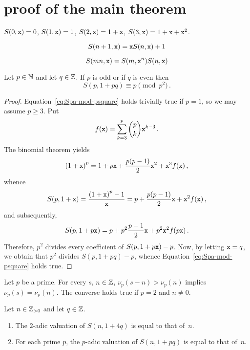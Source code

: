
\section{proof of the main theorem}


   $S(0, \mathtt{x}) = 0$, $S(1, \mathtt{x}) = 1$, $S(2, \mathtt{x}) = 1 + \mathtt{x}$, $S(3, \mathtt{x}) = 1 + \mathtt{x} + \mathtt{x}^2$.

   $$
   S(n + 1, \mathtt{x}) = \mathtt{x} S(n, \mathtt{x}) + 1
   $$

   $$
   S(mn, \mathtt{x}) = S(m, \mathtt{x}^n) S(n, \mathtt{x})
   $$

  
 
   \begin{theorem} \label{thm:p-odd-pcarre}
   Let $p \in \mathbb{N}$ and let $q \in \mathbb{Z}$.
   If $p$ is odd or if $q$ is even then
   \begin{equation} \label{eq:Spa-mod-psquare}
     S(p, 1 + pq) \equiv p \pmod {p^2}\, .
   \end{equation}
   \end{theorem}


   \begin{proof}
    Equation~\eqref{eq:Spa-mod-psquare} holds trivially true if $p = 1$,
    so we may assume $p \ge 3$.
    Put 
    $$
    f(\mathtt{x}) = \sum_{k = 3}^p \binom{p}{k} \mathtt{x}^{k - 3} \, .
    $$
    The binomial theorem yields
   $$
   {(1 + \mathtt{x})}^p =  1 + p \mathtt{x} + \frac{p(p - 1)}{2} \mathtt{x}^2 +  \mathtt{x}^3 f(\mathtt{x}) \,, 
   $$
   whence
   $$
   S(p, 1 + \mathtt{x}) = \frac{{(1 + \mathtt{x})}^p - 1}{\mathtt{x}} = p + \frac{p(p - 1)}{2} \mathtt{x} + \mathtt{x}^2 f(\mathtt{x}) \,, 
   $$
   and subsequently,
   $$
   S(p, 1 + p \mathtt{x}) = p + p^2 \frac{p - 1}{2} \mathtt{x} + p^2  \mathtt{x}^2 f(p\mathtt{x})  \,.
   $$
   Therefore, $p^2$ divides every coefficient of $S(p, 1 + p \mathtt{x}) - p$.
   Now, by letting  $\mathtt{x} = q$, we obtain that $p^2$ divides $S(p, 1 + p q) - p$,
   whence Equation~\eqref{eq:Spa-mod-psquare} holds true.
 \end{proof}

 Let $p$ be a prime.
 For every $s$, $n \in \mathbb{Z}$, 
 $\nu_p(s - n) > \nu_p(n)$ implies $\nu_p(s) = \nu_p(n)$.
 The converse holds true if $p = 2$ and $n \ne 0$.

 \begin{theorem} \label{thm:val-adic}
   Let  $n \in \mathbb{Z}_{> 0}$ and let $q \in \mathbb{Z}$.
   \begin{enumerate}
   \item The $2$-adic valuation of $S(n, 1 + 4 q)$ is equal to that of~$n$.
   \item For each prime $p$, the $p$-adic valuation of $S(n, 1 + p q)$ is equal to that of~$n$.
   \end{enumerate} 
 \end{theorem}

